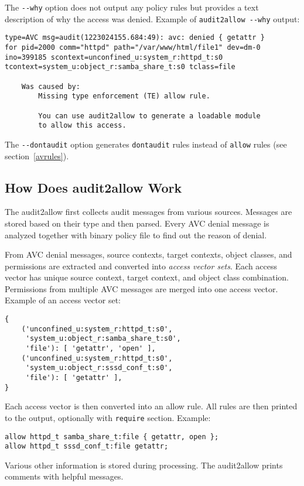 The \texttt{-{}-why} option does not output any policy rules but provides a text
description of why the access was denied. Example of \texttt{audit2allow
-{}-why} output:
\begin{lstlisting}
type=AVC msg=audit(1223024155.684:49): avc: denied { getattr }
for pid=2000 comm="httpd" path="/var/www/html/file1" dev=dm-0
ino=399185 scontext=unconfined_u:system_r:httpd_t:s0
tcontext=system_u:object_r:samba_share_t:s0 tclass=file

    Was caused by:
        Missing type enforcement (TE) allow rule.

        You can use audit2allow to generate a loadable module
        to allow this access.
\end{lstlisting}

The \texttt{-{}-dontaudit} option generates \texttt{dontaudit} rules instead of
\texttt{allow} rules (see section~\ref{avrules}).

\subsection{How Does audit2allow Work}
The audit2allow first collects audit messages from various sources. Messages are
stored based on their type and then parsed. Every AVC denial message is analyzed
together with binary policy file to find out the reason of denial.

From AVC denial messages, source contexts, target contexts, object classes, and
permissions are extracted and converted into \emph{access vector sets}. Each
access vector has unique source context, target context, and object class
combination. Permissions from multiple AVC messages are merged into one access
vector. Example of an access vector set:
\begin{lstlisting}
{
    ('unconfined_u:system_r:httpd_t:s0',
     'system_u:object_r:samba_share_t:s0',
     'file'): [ 'getattr', 'open' ],
    ('unconfined_u:system_r:httpd_t:s0',
     'system_u:object_r:sssd_conf_t:s0',
     'file'): [ 'getattr' ],
}
\end{lstlisting}

Each access vector is then converted into an allow rule. All rules are then
printed to the output, optionally with \texttt{require} section. Example:
\begin{lstlisting}
allow httpd_t samba_share_t:file { getattr, open };
allow httpd_t sssd_conf_t:file getattr;
\end{lstlisting}

Various other information is stored during processing. The audit2allow prints
comments with helpful messages.

